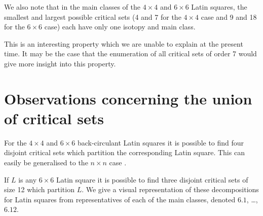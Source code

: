 \documentclass[12pt]{report}
\begin{document}
We also note that in the main classes of the $4 \times 4$ and $6 \times 6$ 
Latin squares, the smallest and largest possible critical sets (4 and 7
for the $4 \times 4$ case and 9 and 18 for the $6 \times 6$ case) each
have only one isotopy and main class.

This is an interesting property which we are unable to explain at
the present time.  It may be the case that the enumeration of
all critical sets of order 7 would give more insight into this
property.

\section{Observations concerning the union of critical sets}

For the $4 \times 4$ and $6 \times 6$ back-circulant Latin squares
it is possible to find four disjoint critical sets which partition
the corresponding Latin square.
This can easily be generalised to the $n \times n$ case \cite{disj}. 

If $L$ is any $6 \times 6$ Latin square it is possible to find three
disjoint critical sets of size 12 which partition $L$.  We give a
visual representation of these decompositions for Latin squares from
representatives of each of the main classes, denoted $6.1$, \dots, $6.12$.
\end{document}
